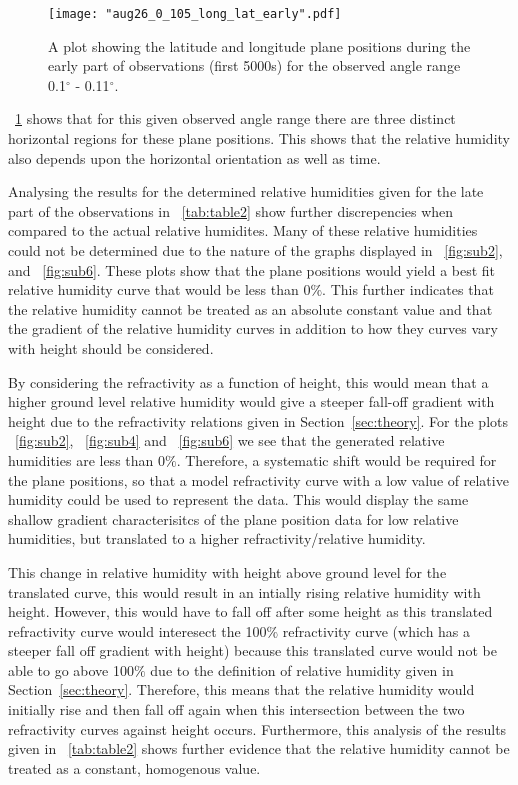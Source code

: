 \documentclass{article}
\newcommand{\figref}[2][\figurename~]{#1\ref{#2}}
\newcommand{\tabref}[2][\tablename~]{#1\ref{#2}}
\newcommand{\secref}[2][Section~]{#1\ref{#2}}
\begin{document}
\begin{figure}[h]
\centering
\texttt{[image: "aug26\_0\_105\_long\_lat\_early".pdf]}
\caption{A plot showing the latitude and longitude plane positions during the early part of observations (first 5000s) for the observed angle range 0.1$^{\circ}$ - 0.11$^{\circ}$.}
\label{fig:long_lat_plot}
\end{figure}

\newpage
\vspace{2mm}
\noindent
\figref{fig:long_lat_plot} shows that for this given observed angle range there are three distinct horizontal regions for these plane positions. This shows that the relative humidity also depends upon the horizontal orientation as well as time.

\vspace{2mm}
\noindent
Analysing the results for the determined relative humidities given for the late part of the observations in \tabref{tab:table2} show further discrepencies when compared to the actual relative humidites. Many of these relative humidities could not be determined due to the nature of the graphs displayed in \figref{fig:sub2}, and \figref{fig:sub6}. These plots show that the plane positions would yield a best fit relative humidity curve that would be less than 0$\%$. This further indicates that the relative humidity cannot be treated as an absolute constant value and that the gradient of the relative humidity curves in addition to how they curves vary with height should be considered. 


\vspace{2mm}
\noindent
By considering the refractivity as a function of height, this would mean that a higher ground level relative humidity would give a steeper fall-off gradient with height due to the refractivity relations given in \secref{sec:theory}. For the plots \figref{fig:sub2}, \figref{fig:sub4} and \figref{fig:sub6} we see that the generated relative humidities are less than 0$\%$. Therefore, a systematic shift would be required for the plane positions, so that a model refractivity curve with a low value of relative humidity could be used to represent the data. This would display the same shallow gradient characterisitcs of the plane position data for low relative humidities, but translated to a higher refractivity/relative humidity.

\vspace{2mm}
\noindent
This change in relative humidity with height above ground level for the translated curve, this would result in an intially rising relative humidity with height. However, this would have to fall off after some height as this translated refractivity curve would interesect the 100$\%$ refractivity curve (which has a steeper fall off gradient with height) because this translated curve would not be able to go above 100$\%$ due to the definition of relative humidity given in \secref{sec:theory}. Therefore, this means that the relative humidity would initially rise and then fall off again when this intersection between the two refractivity curves against height occurs. Furthermore, this analysis of the results given in \tabref{tab:table2} shows further evidence that the relative humidity cannot be treated as a constant, homogenous value.
\end{document}
